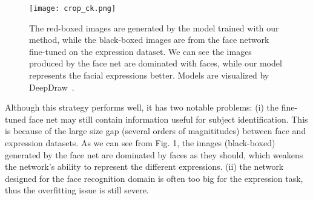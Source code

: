 \documentclass[a4paper, 10pt, conference]{ieeeconf}      %
\begin{document}
\begin{figure}[!ht]
  \centering
    \texttt{[image: crop\_ck.png]}
  \caption{The red-boxed images are generated by the model trained with our method, while the black-boxed images are from the face network fine-tuned on the expression dataset. We can see the images produced by the face net are dominated with faces, while our model represents the facial expressions better. Models are visualized by DeepDraw~\cite{deepdraw}. }
  \label{figurelabel}
  \vspace{-2mm}
\end{figure}


Although this strategy performs well, it has two notable problems: (i) the fine-tuned face net may still contain information useful for subject identification. This is because of the large size gap (several orders of magnititudes) between face and expression datasets.
As we can see from Fig. 1, the images (black-boxed) generated by the face net are dominated by faces as they should, which weakens the network's ability to represent the different expressions. 
(ii) the network designed for the face recognition domain is often too big for the expression task, thus the overfitting issue is still severe. 
\end{document}
